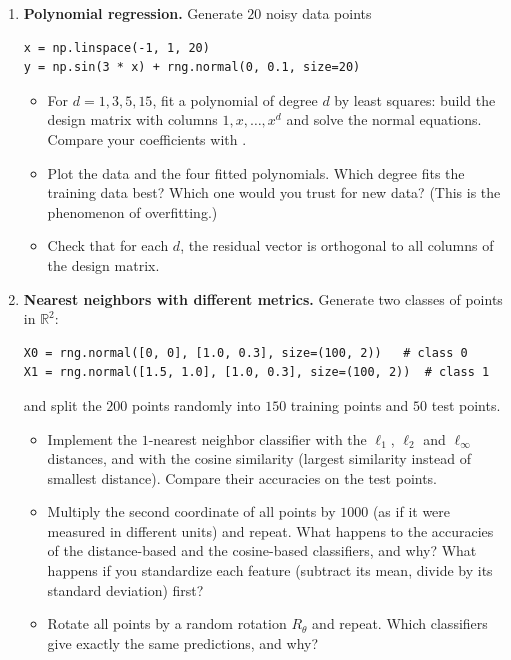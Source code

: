 \documentclass[11pt]{article}
\newcommand{\py}[1]{\texttt{\detokenize{#1}}}
\theoremstyle{definition}
\theoremstyle{plain}
\theoremstyle{remark}
\begin{document}
\begin{enumerate}[label=\textbf{P\arabic*.}, leftmargin=*]
    \item \textbf{Polynomial regression.} Generate $20$ noisy data points
\begin{lstlisting}
x = np.linspace(-1, 1, 20)
y = np.sin(3 * x) + rng.normal(0, 0.1, size=20)
\end{lstlisting}
    \begin{itemize}
        \item For $d = 1, 3, 5, 15$, fit a polynomial of degree $d$ by least squares: build the design matrix with columns $1, x, \ldots, x^d$ and solve the normal equations. Compare your coefficients with \py{np.linalg.lstsq}.
        \item Plot the data and the four fitted polynomials. Which degree fits the training data best? Which one would you trust for new data? (This is the phenomenon of overfitting.)
        \item Check that for each $d$, the residual vector is orthogonal to all columns of the design matrix.
    \end{itemize}

    \item \textbf{Nearest neighbors with different metrics.} Generate two classes of points in $\mathbb{R}^2$:
\begin{lstlisting}
X0 = rng.normal([0, 0], [1.0, 0.3], size=(100, 2))   # class 0
X1 = rng.normal([1.5, 1.0], [1.0, 0.3], size=(100, 2))  # class 1
\end{lstlisting}
    and split the $200$ points randomly into $150$ training points and $50$ test points.
    \begin{itemize}
        \item Implement the $1$-nearest neighbor classifier with the $\ell_1$, $\ell_2$ and $\ell_\infty$ distances, and with the cosine similarity (largest similarity instead of smallest distance). Compare their accuracies on the test points.
        \item Multiply the second coordinate of all points by $1000$ (as if it were measured in different units) and repeat. What happens to the accuracies of the distance-based and the cosine-based classifiers, and why? What happens if you standardize each feature (subtract its mean, divide by its standard deviation) first?
        \item Rotate all points by a random rotation $R_\theta$ and repeat. Which classifiers give exactly the same predictions, and why?
    \end{itemize}


\end{enumerate}
\end{document}
